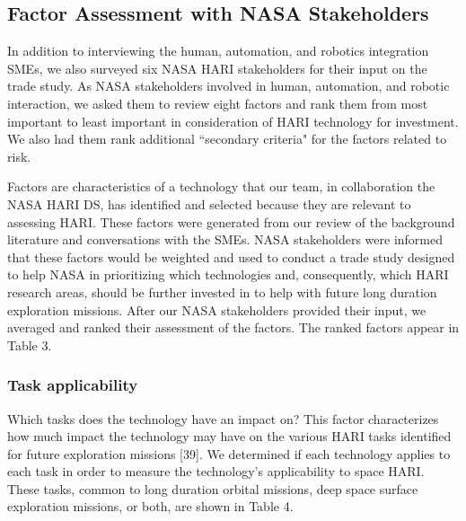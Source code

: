 \subsection{Factor Assessment with NASA Stakeholders}
In addition to interviewing the human, automation, and robotics integration SMEs, we also surveyed six NASA HARI stakeholders for their input on the trade study.
As NASA stakeholders involved in human, automation, and robotic interaction, we asked them to review eight factors and rank them from most important to least important in consideration of HARI technology for investment.
We also had them rank additional ``secondary criteria" for the factors related to risk.

Factors are characteristics of a technology that our team, in collaboration the NASA HARI DS, has identified and selected because they are relevant to assessing HARI.
These factors were generated from our review of the background literature and conversations with the SMEs.
NASA stakeholders were informed that these factors would be weighted and used to conduct a trade study designed to help NASA in prioritizing which technologies and, consequently, which HARI research areas, should be further invested in to help with future long duration exploration missions.
After our NASA stakeholders provided their input, we averaged and ranked their assessment of the factors.
The ranked factors appear in Table 3.


\subsubsection{Task applicability}
Which tasks does the technology have an impact on? This factor characterizes how much impact the technology may have on the various HARI tasks identified for future exploration missions [39].
We determined if each technology applies to each task in order to measure the technology's applicability to space HARI.
These tasks, common to long duration orbital missions, deep space surface exploration missions, or both, are shown in Table 4.

